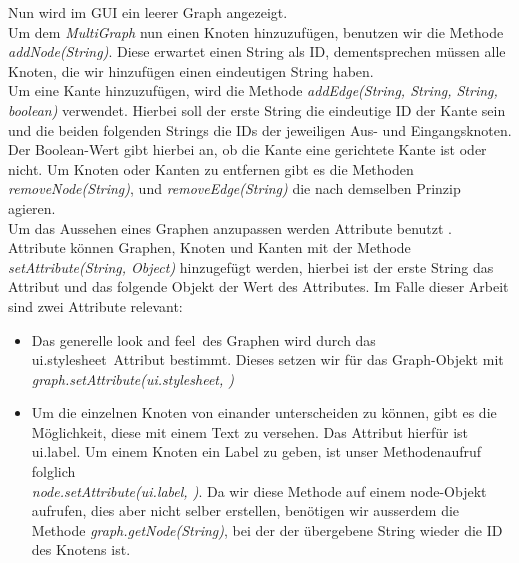 Nun wird im GUI ein leerer Graph angezeigt.\\
Um dem \textit{MultiGraph} nun einen Knoten hinzuzufügen, benutzen wir 
die Methode \textit{addNode(String)}. Diese erwartet einen String als ID,
dementsprechen müssen alle Knoten, die wir hinzufügen einen eindeutigen
String haben.\\
Um eine Kante hinzuzufügen, wird die Methode \textit{addEdge(String, String, String, boolean)} verwendet.
Hierbei soll der erste String die eindeutige ID der Kante sein und die beiden folgenden Strings
die IDs der jeweiligen Aus- und Eingangsknoten.
Der Boolean-Wert gibt hierbei an, ob die Kante eine gerichtete Kante ist oder nicht.
Um Knoten oder Kanten zu entfernen gibt es die Methoden \textit{removeNode(String)},
und \textit{removeEdge(String)} die nach demselben Prinzip agieren.\\

Um das Aussehen eines Graphen anzupassen werden Attribute benutzt \cite{GS_data}.
Attribute können Graphen, Knoten und Kanten mit der Methode \textit{setAttribute(String, Object)}
hinzugefügt werden, hierbei ist der erste String das Attribut und das folgende
Objekt der Wert des Attributes. Im Falle dieser Arbeit sind zwei Attribute relevant:
\begin{itemize}
  \item Das generelle \glqq look and feel\grqq\ des Graphen wird durch das \glqq ui.stylesheet\grqq\ 
    Attribut bestimmt. Dieses setzen wir für das Graph-Objekt mit\\
    \textit{graph.setAttribute(\glqq ui.stylesheet\grqq, \glqq [...]\grqq)}
  \item Um die einzelnen Knoten von einander unterscheiden zu können, gibt es
    die Möglichkeit, diese mit einem Text zu versehen. Das Attribut hierfür ist
    \glqq ui.label\grqq . Um einem Knoten ein Label zu geben, ist unser Methodenaufruf folglich\\
    \textit{node.setAttribute(\glqq ui.label\grqq, \glqq [...]\grqq)}. Da wir diese Methode auf einem 
    node-Objekt aufrufen, dies aber nicht selber erstellen, benötigen wir ausserdem
    die Methode \textit{graph.getNode(String)}, bei der der übergebene String
    wieder die ID des Knotens ist.
\end{itemize}



